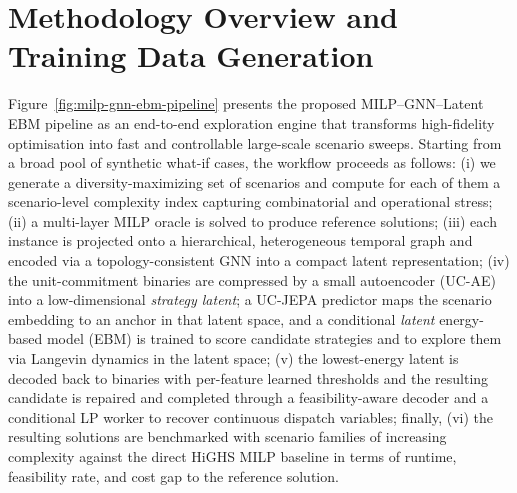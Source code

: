 \documentclass{article}
\begin{document}
\section{Methodology Overview and Training Data Generation}
\label{sec:methodology}
Figure~\ref{fig:milp-gnn-ebm-pipeline} presents the proposed MILP--GNN--Latent EBM pipeline as an end-to-end exploration engine that transforms high-fidelity optimisation into fast and controllable large-scale scenario sweeps. Starting from a broad pool of synthetic what-if cases, the workflow proceeds as follows: (i) we generate a diversity-maximizing set of scenarios and compute for each of them a scenario-level complexity index capturing combinatorial and operational stress; (ii) a multi-layer MILP oracle is solved to produce reference solutions; (iii) each instance is projected onto a hierarchical, heterogeneous temporal graph and encoded via a topology-consistent GNN into a compact latent representation; (iv) the unit-commitment binaries are compressed by a small autoencoder (UC-AE) into a low-dimensional \emph{strategy latent}; a UC-JEPA predictor maps the scenario embedding to an anchor in that latent space, and a conditional \emph{latent} energy-based model (EBM) is trained to score candidate strategies and to explore them via Langevin dynamics in the latent space; (v) the lowest-energy latent is decoded back to binaries with per-feature learned thresholds and the resulting candidate is repaired and completed through a feasibility-aware decoder and a conditional LP worker to recover continuous dispatch variables; finally, (vi) the resulting solutions are benchmarked with scenario families of increasing complexity against the direct HiGHS MILP baseline in terms of runtime, feasibility rate, and cost gap to the reference solution.
\end{document}
